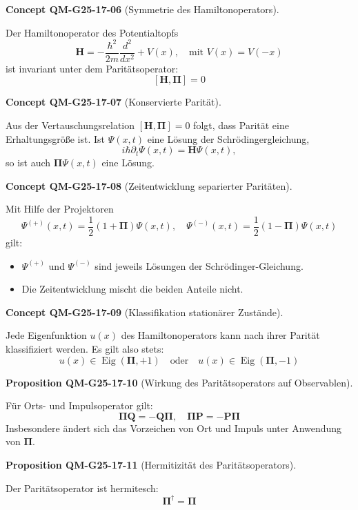 \documentclass[10pt, letterpaper]{article}
\newcommand{\CustomHeading}[3]{%
  \par\medskip\noindent%
  \textbf{#1 #2} \textnormal{(#3)}.\enskip%
}
\newenvironment{PROP}[2]{\CustomHeading{Proposition}{#1}{#2}}{}
\newenvironment{CONC}[2]{\CustomHeading{Concept}{#1}{#2}}{}
\begin{document}
\begin{CONC}{QM-G25-17-06}{Symmetrie des Hamiltonoperators}
Der Hamiltonoperator des Potentialtopfs
\[
\mathbf{H} = -\frac{\hbar^2}{2m} \frac{d^2}{dx^2} + V(x), \quad \text{mit } V(x) = V(-x)
\]
ist invariant unter dem Paritätsoperator:
\[
[\mathbf{H}, \boldsymbol{\Pi}] = 0
\]
\end{CONC}

\begin{CONC}{QM-G25-17-07}{Konservierte Parität}
Aus der Vertauschungsrelation $[\mathbf{H}, \boldsymbol{\Pi}] = 0$ folgt, dass Parität eine Erhaltungsgröße ist. Ist $\Psi(x,t)$ eine Lösung der Schrödingergleichung,
\[
i \hbar \partial_t \Psi(x,t) = \mathbf{H} \Psi(x,t),
\]
so ist auch $\boldsymbol{\Pi} \Psi(x,t)$ eine Lösung.
\end{CONC}

\begin{CONC}{QM-G25-17-08}{Zeitentwicklung separierter Paritäten}
Mit Hilfe der Projektoren
\[
\Psi^{(+)}(x, t) = \frac{1}{2}(1 + \boldsymbol{\Pi}) \Psi(x,t), \quad \Psi^{(-)}(x, t) = \frac{1}{2}(1 - \boldsymbol{\Pi}) \Psi(x,t)
\]
gilt:
\begin{itemize}
\item $\Psi^{(+)}$ und $\Psi^{(-)}$ sind jeweils Lösungen der Schrödinger-Gleichung.
\item Die Zeitentwicklung mischt die beiden Anteile nicht.
\end{itemize}
\end{CONC}

\begin{CONC}{QM-G25-17-09}{Klassifikation stationärer Zustände}
Jede Eigenfunktion $u(x)$ des Hamiltonoperators kann nach ihrer Parität klassifiziert werden. Es gilt also stets:
\[
u(x) \in \operatorname{Eig}(\boldsymbol{\Pi}, +1) \quad \text{oder} \quad u(x) \in \operatorname{Eig}(\boldsymbol{\Pi}, -1)
\]
\end{CONC}

\begin{PROP}{QM-G25-17-10}{Wirkung des Paritätsoperators auf Observablen}
Für Orts- und Impulsoperator gilt:
\[
\boldsymbol{\Pi} \mathbf{Q} = -\mathbf{Q} \boldsymbol{\Pi}, \quad \boldsymbol{\Pi} \mathbf{P} = -\mathbf{P} \boldsymbol{\Pi}
\]
Insbesondere ändert sich das Vorzeichen von Ort und Impuls unter Anwendung von $\boldsymbol{\Pi}$.
\end{PROP}

\begin{PROP}{QM-G25-17-11}{Hermitizität des Paritätsoperators}
Der Paritätsoperator ist hermitesch:
\[
\boldsymbol{\Pi}^\dagger = \boldsymbol{\Pi}
\]
\end{PROP}
\end{document}
